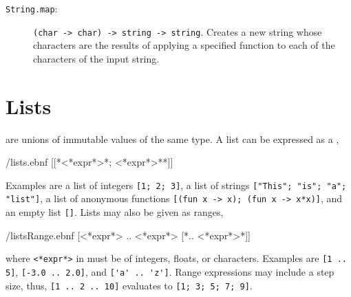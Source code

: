 \begin{description}
 \item[\texttt{String.map}:] \lstinline{(char -> char) -> string -> string}. Creates a new string whose characters are the results of applying a specified function to each of the characters of the input string.
\end{description}

\section{Lists}
 are unions of immutable values of the same type. A list can be expressed as a ,
%
\begin{verbatimwrite}{\ebnf/lists.ebnf}
[[*<*expr*>{*; <*expr*>*}*]]
\end{verbatimwrite}
%
Examples are a list of integers \mbox{\lstinline![1; 2; 3]!}, a list of strings \mbox{\lstinline!["This"; "is"; "a"; "list"]!}, a list of anonymous functions \mbox{\lstinline![(fun x -> x); (fun x -> x*x)]!}, and an empty list \lstinline![]!. Lists may also be given as ranges,
%
\begin{verbatimwrite}{\ebnf/listsRange.ebnf}
[<*expr*> .. <*expr*> [*.. <*expr*>*]]
\end{verbatimwrite}
%
where \lstinline[language=syntax]{<*expr*>} in  must be of integers, floats, or characters. Examples are \mbox{\lstinline![1 .. 5]!}, \mbox{\lstinline![-3.0 .. 2.0]!}, and \mbox{\lstinline!['a' .. 'z']!}. Range expressions may include a step size, thus, \mbox{\lstinline![1 .. 2 .. 10]!} evaluates to \mbox{\lstinline![1; 3; 5; 7; 9]!}.

